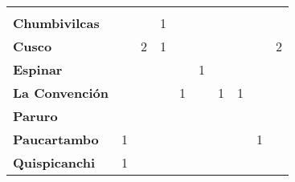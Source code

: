 \begin{tabular}{lccccccccc}
	&\cellcolor[HTML]{FCC46C}					&\cellcolor[HTML]{FCC46C}					&\cellcolor[HTML]{FCC46C}					&\cellcolor[HTML]{FCC46C}					&\cellcolor[HTML]{FCC46C}					&\cellcolor[HTML]{FCC46C}					&\cellcolor[HTML]{FCC46C}					&\cellcolor[HTML]{FCC46C}
	&\cellcolor[HTML]{FCC46C}					\\
	\textbf{Chumbivilcas}                      												
	&\cellcolor[HTML]{FCC46C}					&\cellcolor[HTML]{FCC46C}
	&1											&\cellcolor[HTML]{FCC46C}
	&\cellcolor[HTML]{FCC46C}					&\cellcolor[HTML]{FCC46C}
	&\cellcolor[HTML]{FCC46C}					&\cellcolor[HTML]{FCC46C}
	&\cellcolor[HTML]{FCC46C}\\
	\textbf{Cusco}                            							
	&\cellcolor[HTML]{FCC46C}					&2
	&1											&\cellcolor[HTML]{FCC46C}
	&\cellcolor[HTML]{FCC46C}					&\cellcolor[HTML]{FCC46C}
	&\cellcolor[HTML]{FCC46C}					&\cellcolor[HTML]{FCC46C}
	&2\\
	\textbf{Espinar}       					             									&\cellcolor[HTML]{FCC46C}					&\cellcolor[HTML]{FCC46C}					&\cellcolor[HTML]{FCC46C}					&\cellcolor[HTML]{FCC46C}					&1											&\cellcolor[HTML]{FCC46C}
	&\cellcolor[HTML]{FCC46C}					&\cellcolor[HTML]{FCC46C}
	&\cellcolor[HTML]{FCC46C}\\
	\textbf{La Convención}                      					
	&\cellcolor[HTML]{FCC46C}					&\cellcolor[HTML]{FCC46C}					&\cellcolor[HTML]{FCC46C}					&1											&\cellcolor[HTML]{FCC46C}					&1											&1											&\cellcolor[HTML]{FCC46C} 
	&\cellcolor[HTML]{FCC46C}\\
	\textbf{Paruro}                            					
	&\cellcolor[HTML]{FCC46C}					&\cellcolor[HTML]{FCC46C}					&\cellcolor[HTML]{FCC46C}					&\cellcolor[HTML]{FCC46C}					&\cellcolor[HTML]{FCC46C}					&\cellcolor[HTML]{FCC46C}
	&\cellcolor[HTML]{FCC46C} 					&\cellcolor[HTML]{FCC46C}
	&\cellcolor[HTML]{FCC46C}\\
	\textbf{Paucartambo}               		                       			
	&1											&\cellcolor[HTML]{FCC46C}					&\cellcolor[HTML]{FCC46C}					&\cellcolor[HTML]{FCC46C}					&\cellcolor[HTML]{FCC46C}					&\cellcolor[HTML]{FCC46C}					&\cellcolor[HTML]{FCC46C}					&1							
	&\cellcolor[HTML]{FCC46C}\\
	\textbf{Quispicanchi}                                         	      					
	&1											&\cellcolor[HTML]{FCC46C}
	&\cellcolor[HTML]{FCC46C} 					&\cellcolor[HTML]{FCC46C}
	&\cellcolor[HTML]{FCC46C}					&\cellcolor[HTML]{FCC46C}
	&\cellcolor[HTML]{FCC46C}					&\cellcolor[HTML]{FCC46C}
	&\cellcolor[HTML]{FCC46C}\\

\end{tabular}
